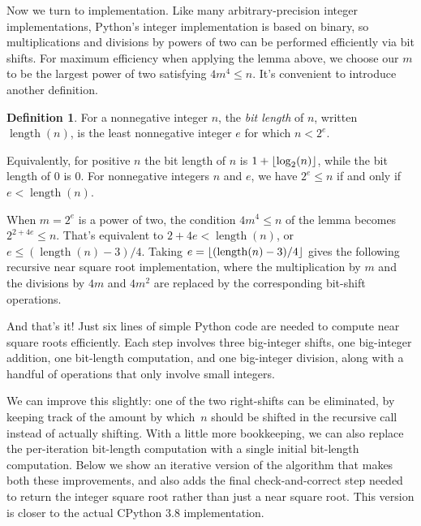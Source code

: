 \documentclass[a4paper]{article}
\DeclarePairedDelimiter\floor{\lfloor}{\rfloor}
\DeclareMathOperator{\length}{length}
\theoremstyle{plain}
\theoremstyle{definition}
\newtheorem{definition}[theorem]{Definition}
\begin{document}
Now we turn to implementation. Like many arbitrary-precision integer
implementations, Python's integer implementation is based on binary, so
multiplications and divisions by powers of two can be performed efficiently via
bit shifts. For maximum efficiency when applying the lemma above, we
choose our $m$ to be the largest power of two satisfying $4m^4 \le n$. It's
convenient to introduce another definition.

\begin{definition}
  For a nonnegative integer $n$, the \emph{bit length} of $n$, written
  $\length(n)$, is the least nonnegative integer $e$ for which $n < 2^e$.
\end{definition}

Equivalently, for positive $n$ the bit length of $n$ is $1 +
\floor{\log_2(n)}$, while the bit length of $0$ is $0$. For nonnegative
integers $n$ and $e$, we have $2^e \le n$ if and only if $e < \length(n)$.

When $m = 2^e$ is a power of two, the condition $4m^4 \le n$ of the lemma
becomes $2^{2 + 4e} \le n$. That's equivalent to $2 + 4e < \length(n)$, or $e
\le (\length(n) - 3) / 4$. Taking $e = \floor{(\length(n) - 3) / 4}$ gives the
following recursive near square root implementation, where the multiplication
by $m$ and the divisions by $4m$ and $4m^2$ are replaced by the corresponding
bit-shift operations.



And that's it! Just six lines of simple Python code are needed to compute near
square roots efficiently. Each step involves three big-integer shifts, one
big-integer addition, one bit-length computation, and one big-integer division,
along with a handful of operations that only involve small integers.

We can improve this slightly: one of the two right-shifts can be eliminated, by
keeping track of the amount by which~$n$ should be shifted in the recursive
call instead of actually shifting. With a little more bookkeeping, we can
also replace the per-iteration bit-length computation with a single
initial bit-length computation. Below we show an iterative version of the
algorithm that makes both these improvements, and also adds the final
check-and-correct step needed to return the integer square root rather
than just a near square root. This version is closer to the actual
CPython 3.8 implementation.


\end{document}
